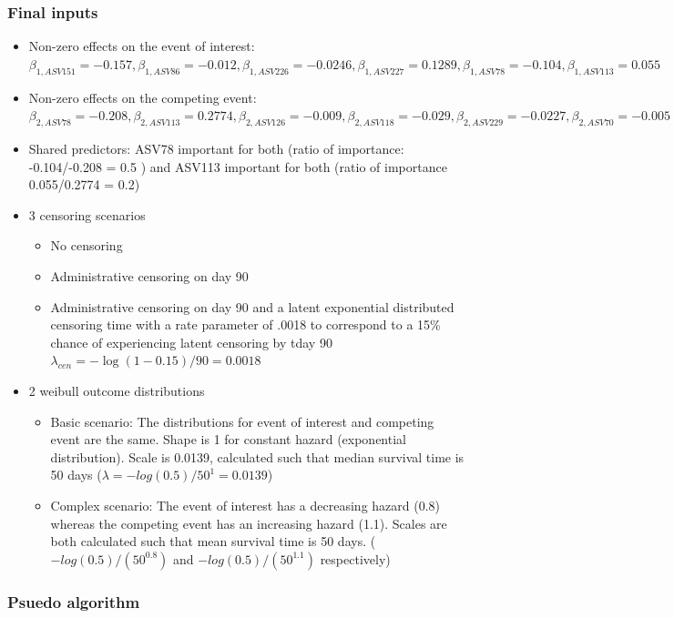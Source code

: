 \documentclass[11pt,a4paper]{article}
\begin{document}
\subsubsection{Final inputs}
\begin{itemize}
    \item Non-zero effects on the event of interest:\\ $\beta_{1, ASV151} = -0.157, \beta_{1,ASV86} = -0.012, \beta_{1,ASV226} = -0.0246, \beta_{1,ASV227} = 0.1289, \beta_{1,ASV78} = -0.104, \beta_{1,ASV113}= 0.055
    $
    \item Non-zero effects on the competing event: \\$\beta_{2,ASV78}= -0.208, \beta_{2,ASV113}= 0.2774, \beta_{2,ASV126}=-0.009, \beta_{2,ASV118}=-0.029, \beta_{2,ASV229}=-0.0227, \beta_{2,ASV70}=-0.005$
    \item Shared predictors: ASV78 important for both (ratio of importance: -0.104/-0.208 = 0.5 ) and ASV113 important for both (ratio of importance 0.055/0.2774 = 0.2)
    \item 3 censoring scenarios
    \begin{itemize}
        \item No censoring
        \item Administrative censoring on day 90
        \item Administrative censoring on day 90 and a latent exponential distributed censoring time with a rate parameter of .0018 to correspond to a 15\% chance of experiencing latent censoring by tday 90 $\lambda_{cen} = -\log(1- 0.15)/90= 0.0018$
    \end{itemize}
    \item 2 weibull outcome distributions
    \begin{itemize}
        \item Basic scenario: The distributions for event of interest and competing event are the same. Shape is 1 for constant hazard (exponential distribution). Scale is 0.0139, calculated such that median survival time is 50 days ($\lambda = -log(0.5)/50^1 = 0.0139$)
        \item Complex scenario: The event of interest has a decreasing hazard (0.8) whereas the competing event has an increasing hazard (1.1). Scales are both calculated such that mean survival time is 50 days. ($-log(0.5)/(50^{0.8})$ and $-log(0.5)/(50^{1.1})$ respectively)
    \end{itemize}
\end{itemize}
\subsubsection{Psuedo algorithm}
\end{document}

